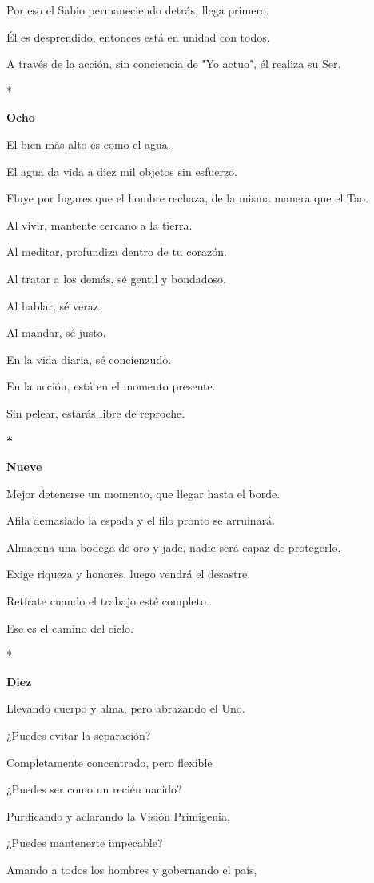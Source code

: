 Por eso el Sabio permaneciendo detrás, llega primero.

Él es desprendido, entonces está en unidad con todos.

A través de la acción, sin conciencia de "Yo actuo", él realiza su Ser.

*

\textbf{Ocho}

El bien más alto es como el agua.

El agua da vida a diez mil objetos sin esfuerzo.

Fluye por lugares que el hombre rechaza, de la misma manera que el Tao.

Al vivir, mantente cercano a la tierra.

Al meditar, profundiza dentro de tu corazón.

Al tratar a los demás, sé gentil y bondadoso.

Al hablar, sé veraz.

Al mandar, sé justo.

En la vida diaria, sé concienzudo.

En la acción, está en el momento presente.

Sin pelear, estarás libre de reproche.

\textbf{*}

\textbf{Nueve}

Mejor detenerse un momento, que llegar hasta el borde.

Afila demasiado la espada y el filo pronto se arruinará.

Almacena una bodega de oro y jade, nadie será capaz de protegerlo.

Exige riqueza y honores, luego vendrá el desastre.

Retírate cuando el trabajo esté completo.

Ese es el camino del cielo.

*

\textbf{Diez}

Llevando cuerpo y alma, pero abrazando el Uno.

¿Puedes evitar la separación?

Completamente concentrado, pero flexible

¿Puedes ser como un recién nacido?

Purificando y aclarando la Visión Primigenia,

¿Puedes mantenerte impecable?

Amando a todos los hombres y gobernando el país,

